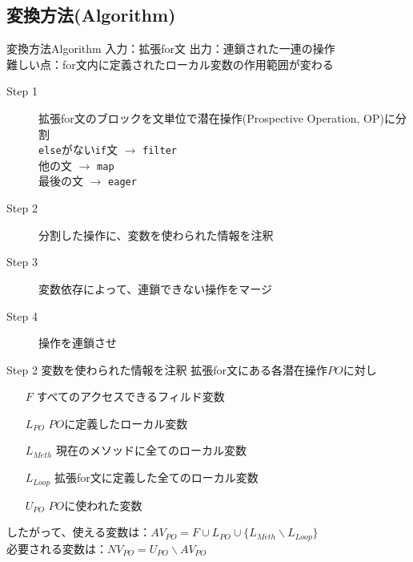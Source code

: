 \subsection{変換方法(Algorithm)}
\begin{frame}{変換方法}{Algorithm}
  入力：拡張for文 \quad 出力：連鎖された一連の操作 \\
  難しい点：for文内に定義されたローカル変数の作用範囲が変わる
  \begin{description}
    \item[Step 1] 拡張for文のブロックを文単位で潜在操作(Prospective Operation, OP)に分割 \\
              {\small \texttt{else}がない\texttt{if}文 $\rightarrow$ \texttt{filter}\\
              他の文 $\rightarrow$ \texttt{map} \\
              最後の文 $\rightarrow$ \texttt{eager}}
    \item[Step 2] 分割した操作に、変数を使わられた情報を注釈
    \item[Step 3] 変数依存によって、連鎖できない操作をマージ
    \item[Step 4] 操作を連鎖させ
  \end{description}
\end{frame}
\begin{frame}{Step 2 変数を使わられた情報を注釈}
拡張for文にある各潜在操作$PO$に対し
\begin{itemize}
  \item[$F$] すべてのアクセスできるフィルド変数
  \item[$L_{PO}$] $PO$に定義したローカル変数
  \item[$L_{Meth}$] 現在のメソッドに全てのローカル変数
  \item[$L_{Loop}$] 拡張for文に定義した全てのローカル変数
  \item[$U_{PO}$] $PO$に使われた変数
\end{itemize}
したがって、使える変数は：$AV_{PO} = F \cup L_{PO} \cup \{ L_{Meth} \backslash L_{Loop} \}$ \\
必要される変数は：$NV_{PO} = U_{PO} \backslash AV_{PO}$
\end{frame}

